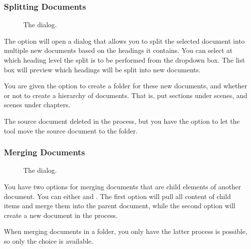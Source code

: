 \documentclass[a4paper,11pt,english]{sphinxmanual}
\begin{document}
\subsubsection{Splitting Documents}
\label{\detokenize{usage_project:splitting-documents}}
\begin{figure}[htbp]
\centering
\capstart

\noindent{}
\caption{The  dialog.}\label{\detokenize{usage_project:id2}}\end{figure}

\sphinxAtStartPar
The  option will open a dialog that allows you to split the selected
document into multiple new documents based on the headings it contains. You can select at which
heading level the split is to be performed from the dropdown box. The list box will preview which
headings will be split into new documents.

\sphinxAtStartPar
You are given the option to create a folder for these new documents, and whether or not to create a
hierarchy of documents. That is, put sections under scenes, and scenes under chapters.

\sphinxAtStartPar
The source document  deleted in the process, but you have the option to let the tool move
the source document to the  folder.


\subsubsection{Merging Documents}
\label{\detokenize{usage_project:merging-documents}}
\begin{figure}[htbp]
\centering
\capstart

\noindent{}
\caption{The  dialog.}\label{\detokenize{usage_project:id3}}\end{figure}

\sphinxAtStartPar
You have two options for merging documents that are child elements of another document. You can
either  and . The first option will
pull all content of child items and merge them into the parent document, while the second option
will create a new document in the process.

\sphinxAtStartPar
When merging documents in a folder, you only have the latter process is possible, so only the
choice  is available.
\end{document}
